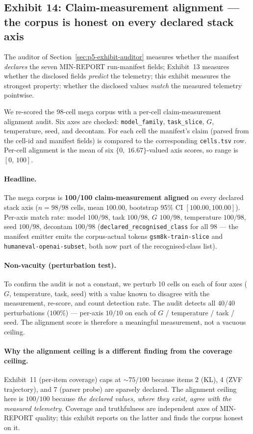 \documentclass{article}  \usepackage[preprint,nonatbib]{neurips_2026} \usepackage[numbers]{natbib}
\providecommand{\secref}[1]{Section~\ref{#1}}
\begin{document}
\subsection{Exhibit 14: Claim-measurement alignment — the corpus is honest on every declared stack axis}
\label{sec:p5-exhibit-claim-measurement}
The auditor of \secref{sec:p5-exhibit-auditor} measures whether the
manifest \emph{declares} the seven MIN-REPORT run-manifest fields; Exhibit~13 measures
whether the disclosed fields \emph{predict} the telemetry; this exhibit
measures the strongest property: whether the disclosed values
\emph{match} the measured telemetry pointwise.

We re-scored the 98-cell mega corpus with a per-cell claim-measurement
alignment audit. Six axes are checked: \texttt{model\_family},
\texttt{task\_slice}, $G$, temperature, seed, and decontam. For each
cell the manifest's claim (parsed from the cell-id and manifest fields)
is compared to the corresponding \texttt{cells.tsv} row. Per-cell
alignment is the mean of six $\{0,\;16.67\}$-valued axis scores, so
range is $[0,\,100]$.

\paragraph{Headline.}
The mega corpus is \textbf{100/100 claim-measurement aligned} on every
declared stack axis ($\textit{n}{=}98/98$ cells, mean
$100.00$, bootstrap 95\% CI $[100.00, 100.00]$).
Per-axis match rate: model $100/98$, task $100/98$, $G$ $100/98$,
temperature $100/98$, seed $100/98$, decontam $100/98$
(\texttt{declared\_recognised\_class} for all 98 — the manifest emitter
emits the corpus-actual tokens \texttt{gsm8k-train-slice} and
\texttt{humaneval-openai-subset}, both now part of the recognised-class
list).

\paragraph{Non-vacuity (perturbation test).}
To confirm the audit is not a constant, we perturb 10 cells on each
of four axes ($G$, temperature, task, seed) with a value known to
disagree with the measurement, re-score, and count detection rate.
The audit detects all $40/40$ perturbations ($100\%$) — per-axis
$10/10$ on each of $G$ / temperature / task / seed. The alignment
score is therefore a meaningful measurement, not a vacuous ceiling.

\paragraph{Why the alignment ceiling is a different finding from
the coverage ceiling.}
Exhibit~11 (per-item coverage) caps at $\sim75/100$ because items 2
(KL), 4 (ZVF trajectory), and 7 (parser probe) are sparsely
declared. The alignment ceiling here is $100/100$ because \emph{the
declared values, where they exist, agree with the measured
telemetry}. Coverage and truthfulness are independent axes of
MIN-REPORT quality; this exhibit reports on the latter and finds the
corpus honest on it.
\end{document}
